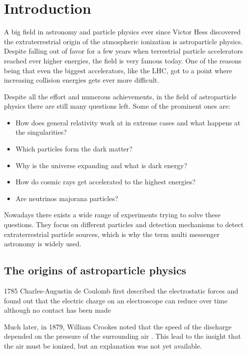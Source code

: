 \chapter{Introduction}

A big field in astronomy and particle physics ever since Victor Hess discovered
the extraterrestrial origin of the atmospheric ionization
is astroparticle physics. Despite falling out of favor for a few years
when terrestrial particle accelerators reached ever higher energies,
the field is very famous today. One of the reasons being that
even the biggest accelerators, like the LHC, got to a point where
increasing collision energies gets ever more difficult.

Despite all the effort and numerous achievements,
in the field of astroparticle physics
there are still many questions left.
Some of the prominent ones are:
\begin{itemize}
    \item{How does general relativity work at in extreme cases and 
	what happens at the singularities?}
    \item{Which particles form the dark matter?}
    \item{Why is the universe expanding and what is dark energy?}
    \item{How do cosmic rays get accelerated to the highest energies?}
    \item{Are neutrinos majorana particles?}
\end{itemize}

Nowadays there exists a wide range of experiments trying to
solve these questions. They focus on different particles and detection
mechanisms to detect
extraterrestrial particle sources, which is why
the term multi messenger astronomy is widely used.


\section{The origins of astroparticle physics}
1785 Charles-Augustin de Coulomb first described the electrostatic forces 
and found out that the electric charge on an electroscope can
reduce over time although no contact has been made \cite{???}

Much later, in 1879, William Crookes noted that the speed of the discharge
depended on the pressure of the surrounding air 
\cite{doi:10.1098/rstl.1879.0076}.
This lead to the insight that the air must be ionized, but an 
explanation was not yet available.

